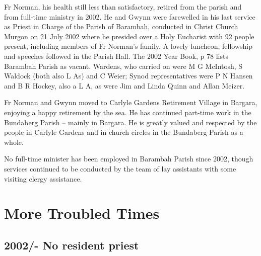 Fr Norman, his health still less than satisfactory, retired from the parish and from full-time ministry in 2002. He and Gwynn were farewelled in his last service as Priest in Charge of the Parish of Barambah, conducted in Christ Church Murgon on 21 July 2002 where he presided over a Holy Eucharist with 92 people present, including members of Fr Norman's family. A lovely luncheon, fellowship and speeches followed in the Parish Hall. The 2002 Year Book, p 78 lists Barambah Parish as vacant. Wardens, who carried on were M G McIntosh, S Waldock (both also L As) and C Weier; Synod representatives were P N Hansen and B R Hockey, also a L A, as were Jim and Linda Quinn and Allan Meizer.



Fr Norman and Gwynn moved to Carlyle Gardens Retirement Village in Bargara, enjoying a happy retirement by the sea. He has continued part-time work in the Bundaberg Parish -- mainly in Bargara. He is greatly valued and respected by the people in Carlyle Gardens and in church circles in the Bundaberg Parish as a whole.



No full-time minister has been employed in Barambah Parish since 2002, though services continued to be conducted by the team of lay assistants with some visiting clergy assistance.



\balance


\printendnotes[custom]
\setcounter{endnote}{0}
\chapter{More Troubled Times}
\nobalance


\section{2002/- No resident priest}



